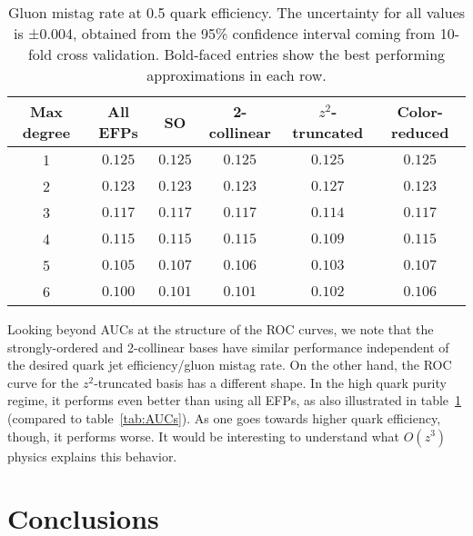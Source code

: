 \documentclass[a4paper,11pt]{article}
\newcommand{\tab}[1]{table~\ref{tab:#1}}
\begin{document}
\begin{table}[!t]
\centering
\begin{tabular}{c || c || c | c | c | c }
Max degree & All EFPs                   & SO                            &  2-collinear                &    $z^2$-truncated  &    Color-reduced   \\ \hline \hline
 1                 &  $0.125$   &  \boldmath $0.125  $   &  \boldmath $0.125  $   &    \boldmath  $0.125  $   &   \boldmath $0.125 $   \\ \hline
 2                 &   $0.123$   &  \boldmath $0.123  $   & \boldmath $0.123  $   &    $0.127  $   &   \boldmath$0.123 $          \\ \hline
 3                 & $0.117$   & $0.117  $   & $0.117  $   &     \boldmath $0.114  $   &   $0.117 $          \\ \hline
 4                 & $0.115$   & $0.115  $   & $0.115  $   &     \boldmath $0.109  $   &   $0.115 $         \\ \hline
 5                 & $0.105$   & $0.107  $   & $0.106  $   &     \boldmath $0.103  $   &   $0.107 $       \\ \hline
 6                 & $0.100$   &  \boldmath $0.101  $   &  \boldmath  $0.101  $   &    $0.102  $   &   $0.106 $           \\ 
\end{tabular}
\caption{Gluon mistag rate at 0.5 quark efficiency. The uncertainty for all values is ±0.004, obtained from the 95\% confidence interval coming from 10-fold cross validation. Bold-faced entries show the best performing approximations in each row.
\label{tab:mistag-rate} }
\end{table}




Looking beyond AUCs at the structure of the ROC curves, we note that the strongly-ordered and 2-collinear bases have similar performance independent of the desired quark jet efficiency/gluon mistag rate.
%
On the other hand, the ROC curve for the $z^2$-truncated basis has a different shape.
%
In the high quark purity regime, it performs even better than using all EFPs, as also illustrated in \tab{mistag-rate} (compared to \tab{AUCs}).
%
As one goes towards higher quark efficiency, though, it performs worse.
%
It would be interesting to understand what $O(z^3)$ physics explains this behavior.

     

\section{Conclusions}
\label{sec:conc}
\end{document}

